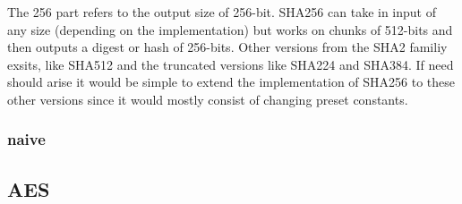 \documentclass[a4paper]{article}
\begin{document}
The 256 part refers to the output size of 256-bit.
SHA256 can take in input of any size (depending on the implementation) but works
on chunks of 512-bits and then outputs a digest or hash of 256-bits.
Other versions from the SHA2 familiy exsits, like SHA512 and the truncated
versions like SHA224 and SHA384. If need should arise it would be simple to extend
the implementation of SHA256 to these other versions since it would mostly
consist of changing preset constants.

\subsubsection{naive}
\label{AESnaive}
\subsection{AES}
\label{sec:org812f731}
\end{document}
